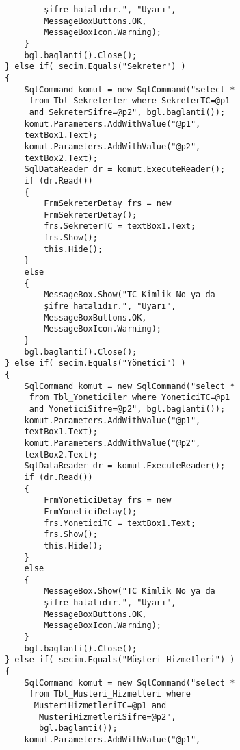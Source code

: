 \begin{lstlisting}
                    şifre hatalıdır.", "Uyarı", 
                    MessageBoxButtons.OK, 
                    MessageBoxIcon.Warning);
                }
                bgl.baglanti().Close();
            } else if( secim.Equals("Sekreter") )
            {
                SqlCommand komut = new SqlCommand("select *
                 from Tbl_Sekreterler where SekreterTC=@p1 
                 and SekreterSifre=@p2", bgl.baglanti());
                komut.Parameters.AddWithValue("@p1", 
                textBox1.Text);
                komut.Parameters.AddWithValue("@p2", 
                textBox2.Text);
                SqlDataReader dr = komut.ExecuteReader();
                if (dr.Read())
                {
                    FrmSekreterDetay frs = new 
                    FrmSekreterDetay();
                    frs.SekreterTC = textBox1.Text;
                    frs.Show();
                    this.Hide();
                }
                else
                {
                    MessageBox.Show("TC Kimlik No ya da 
                    şifre hatalıdır.", "Uyarı", 
                    MessageBoxButtons.OK, 
                    MessageBoxIcon.Warning);
                }
                bgl.baglanti().Close();
            } else if( secim.Equals("Yönetici") )
            {
                SqlCommand komut = new SqlCommand("select *
                 from Tbl_Yoneticiler where YoneticiTC=@p1 
                 and YoneticiSifre=@p2", bgl.baglanti());
                komut.Parameters.AddWithValue("@p1", 
                textBox1.Text);
                komut.Parameters.AddWithValue("@p2", 
                textBox2.Text);
                SqlDataReader dr = komut.ExecuteReader();
                if (dr.Read())
                {
                    FrmYoneticiDetay frs = new 
                    FrmYoneticiDetay();
                    frs.YoneticiTC = textBox1.Text;
                    frs.Show();
                    this.Hide();
                }
                else
                {
                    MessageBox.Show("TC Kimlik No ya da 
                    şifre hatalıdır.", "Uyarı", 
                    MessageBoxButtons.OK, 
                    MessageBoxIcon.Warning);
                }
                bgl.baglanti().Close();
            } else if( secim.Equals("Müşteri Hizmetleri") )
            {
                SqlCommand komut = new SqlCommand("select *
                 from Tbl_Musteri_Hizmetleri where
                  MusteriHizmetleriTC=@p1 and
                   MusteriHizmetleriSifre=@p2", 
                   bgl.baglanti());
                komut.Parameters.AddWithValue("@p1", 

\end{lstlisting}
